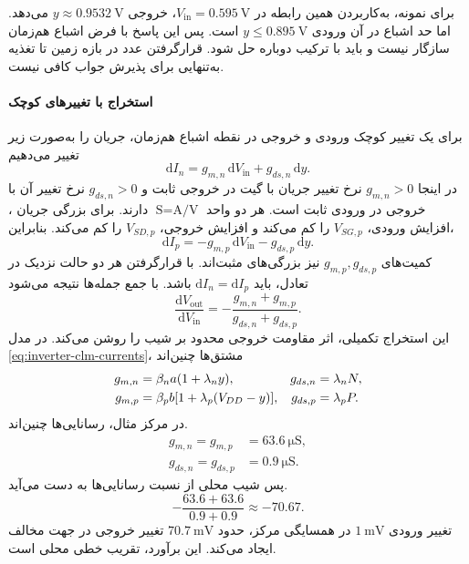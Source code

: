 برای نمونه، به‌کاربردن همین رابطه در
\(V_{\mathrm{in}}=\qty{0.595}{\volt}\)، خروجی
\(y\approx\qty{0.9532}{\volt}\) می‌دهد. اما حد اشباع
 در آن ورودی \(y\le\qty{0.895}{\volt}\) است.
پس این پاسخ با فرض اشباع هم‌زمان سازگار نیست و باید با ترکیب
 دوباره حل شود. قرارگرفتن عدد در بازه
زمین تا تغذیه به‌تنهایی برای پذیرش جواب کافی نیست.

\paragraph*{استخراج  با تغییرهای کوچک}
برای یک تغییر کوچک ورودی و خروجی در نقطه اشباع هم‌زمان،
جریان  را به‌صورت زیر تغییر می‌دهیم
\begin{equation}
 \mathrm{d}I_n=g_{m,n}\,\mathrm{d}V_{\mathrm{in}}
                +g_{ds,n}\,\mathrm{d}y.
 \label{eq:inverter-small-change-n}
\end{equation}
در اینجا \(g_{m,n}>0\) نرخ تغییر جریان با گیت در خروجی ثابت و
\(g_{ds,n}>0\) نرخ تغییر آن با خروجی در ورودی ثابت است.
هر دو واحد \(\unit{\siemens}=\unit{\ampere\per\volt}\) دارند.
برای بزرگی جریان ، افزایش ورودی، \(V_{SG,p}\) را کم
می‌کند و افزایش خروجی، \(V_{SD,p}\) را کم می‌کند. بنابراین،
\begin{equation}
 \mathrm{d}I_p=-g_{m,p}\,\mathrm{d}V_{\mathrm{in}}
                 -g_{ds,p}\,\mathrm{d}y.
 \label{eq:inverter-small-change-p}
\end{equation}
کمیت‌های \(g_{m,p},g_{ds,p}\) نیز بزرگی‌های مثبت‌اند. با
قرارگرفتن هر دو حالت نزدیک در تعادل، باید
\(\mathrm{d}I_n=\mathrm{d}I_p\) باشد. با جمع جمله‌ها نتیجه می‌شود
\begin{equation}
 \boxed{\frac{\mathrm{d}V_{\mathrm{out}}}{\mathrm{d}V_{\mathrm{in}}}
 =-\frac{g_{m,n}+g_{m,p}}{g_{ds,n}+g_{ds,p}}}.
 \label{eq:inverter-gain}
\end{equation}
این استخراج تکمیلی، اثر مقاومت خروجی محدود بر شیب را روشن می‌کند.
در مدل \eqref{eq:inverter-clm-currents}، مشتق‌ها چنین‌اند
\begin{align}
 g_{m,n}&=\beta_na(1+\lambda_n y),&
 g_{ds,n}&=\lambda_nN,\notag\\
 g_{m,p}&=\beta_pb[1+\lambda_p(V_{DD}-y)],&
 g_{ds,p}&=\lambda_pP.
 \label{eq:inverter-clm-derivatives}
\end{align}
در مرکز مثال، رسانایی‌ها چنین‌اند.
\[
 \begin{aligned}
 g_{m,n}=g_{m,p}&=\qty{63.6}{\micro\siemens},\\
 g_{ds,n}=g_{ds,p}&=\qty{0.9}{\micro\siemens}.
 \end{aligned}
\]
پس شیب محلی از نسبت رسانایی‌ها به دست می‌آید.
\[
 -\frac{63.6+63.6}{0.9+0.9}\approx-70.67.
\]
تغییر ورودی \(\qty{1}{\milli\volt}\) در همسایگی مرکز، حدود
\(\qty{70.7}{\milli\volt}\) تغییر خروجی در جهت مخالف ایجاد
می‌کند. این برآورد، تقریب خطی محلی است.

